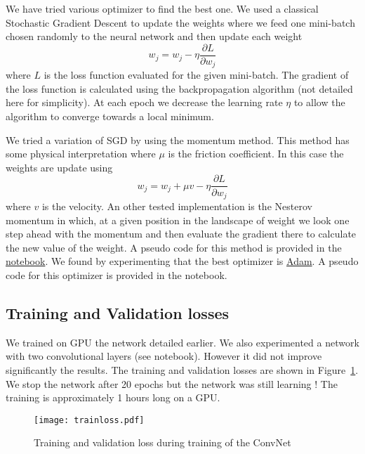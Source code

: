 \documentclass[10pt]{article}
\begin{document}
We have tried various optimizer to find the best one. We used a classical Stochastic Gradient Descent to update the weights where we feed one mini-batch chosen randomly to the neural network and then update each weight
\begin{equation}
	w_j = w_j - \eta \frac{\partial L}{\partial w_j}
\end{equation}
where $L$ is the loss function evaluated for the given mini-batch. The gradient of the loss function is calculated using the backpropagation algorithm (not detailed here for simplicity). At each epoch we decrease the learning rate $\eta$ to allow the algorithm to converge towards a local minimum.

We tried a variation of SGD by using the momentum method. This method has some physical interpretation where $\mu$ is the friction coefficient. In this case the weights are update using
\begin{equation}
	w_j = w_j + \mu v - \eta \frac{\partial L}{\partial w_j}
\end{equation}
where $v$ is the velocity. An other tested implementation is the Nesterov momentum in which, at a given position in the landscape of weight we look one step ahead with the momentum and then evaluate the gradient there to calculate the new value of the weight. A pseudo code for this method is provided in the \href{https://github.com/tperol/am207-NILM-project/blob/master/Report_convnet.ipynb}{notebook}. We found by experimenting that the best optimizer is \href{http://arxiv.org/pdf/1412.6980v8.pdf}{Adam}. A pseudo code for this optimizer is provided in the notebook.

\subsection{Training and Validation losses}
We trained on GPU the network detailed earlier. We also experimented a network with two convolutional layers (see notebook). However it did not improve significantly the results. The training and validation losses are shown in Figure~\ref{fig:trainloss}. We stop the network after 20 epochs but the network was still learning ! The training is approximately 1 hours long on a GPU.

\begin{figure}[!ht]
\begin{center}
\texttt{[image: trainloss.pdf]}
\caption{Training and validation loss during training of the ConvNet}
\label{fig:trainloss}
\end{center}
\end{figure}
\end{document}
